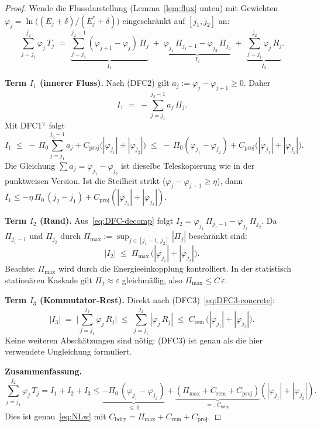 \documentclass[12pt,a4paper]{article}
\theoremstyle{breakdef}
\theoremstyle{breakplain}
\theoremstyle{breakdef}
\begin{document}
\begin{proof}
Wende die Flussdarstellung (Lemma~\ref{lem:flux} unten) mit Gewichten
$\varphi_j = \ln\bigl((E_j+\delta)/(E_j^*+\delta)\bigr)$
eingeschränkt auf $[j_1, j_2]$ an:
\begin{equation}\label{eq:DFC-decomp}
  \sum_{j=j_1}^{j_2} \varphi_j\,T_j
  \;=\;
  \underbrace{\sum_{j=j_1}^{j_2-1}
    (\varphi_{j+1} - \varphi_j)\,\Pi_j}_{I_1}
  \;+\;
  \underbrace{\varphi_{j_1}\,\Pi_{j_1-1}
    - \varphi_{j_2}\,\Pi_{j_2}}_{I_2}
  \;+\;
  \underbrace{\sum_{j=j_1}^{j_2} \varphi_j\,R_j}_{I_3}.
\end{equation}

\textbf{Term $I_1$ (innerer Fluss).}\quad
Nach (DFC2) gilt $a_j:=\varphi_j-\varphi_{j+1}\ge0$. Daher
\[
  I_1
  \;=\; -\sum_{j=j_1}^{j_2-1} a_j\,\Pi_j.
\]
Mit DFC1$^\vee$ folgt
\[
  I_1
  \;\le\;
  -\,\Pi_0\sum_{j=j_1}^{j_2-1}a_j
  + C_{\mathrm{proj}}\bigl(|\varphi_{j_1}|+|\varphi_{j_2}|\bigr)
  \;\le\;
  -\,\Pi_0(\varphi_{j_1}-\varphi_{j_2})
  + C_{\mathrm{proj}}\bigl(|\varphi_{j_1}|+|\varphi_{j_2}|\bigr).
\]
Die Gleichung $\sum a_j=\varphi_{j_1}-\varphi_{j_2}$ ist dieselbe
Teleskopierung wie in der punktweisen Version.
Ist die Steilheit strikt ($\varphi_j - \varphi_{j+1} \ge \eta$),
dann
$I_1 \le -\eta\,\Pi_0\,(j_2 - j_1)
+ C_{\mathrm{proj}}(|\varphi_{j_1}|+|\varphi_{j_2}|)$.

\textbf{Term $I_2$ (Rand).}\quad
Aus~\eqref{eq:DFC-decomp} folgt $I_2 = \varphi_{j_1}\,\Pi_{j_1-1}
- \varphi_{j_2}\,\Pi_{j_2}$. Da $\Pi_{j_1-1}$ und $\Pi_{j_2}$
durch $\Pi_{\max} := \sup_{j \in [j_1-1,\,j_2]}|\Pi_j|$ beschränkt sind:
\begin{equation}\label{eq:I2-bound}
  |I_2|
  \;\le\;
  \Pi_{\max}\,\bigl(|\varphi_{j_1}| + |\varphi_{j_2}|\bigr).
\end{equation}
Beachte: $\Pi_{\max}$ wird durch die Energieeinkopplung kontrolliert. In
der statistisch stationären Kaskade gilt $\Pi_j \approx \varepsilon$
gleichmäßig, also $\Pi_{\max} \le C\,\varepsilon$.

\textbf{Term $I_3$ (Kommutator-Rest).}\quad
Direkt nach (DFC3)~\eqref{eq:DFC3-concrete}:
\begin{equation}\label{eq:I3-bound}
  |I_3|
  \;=\;
  \biggl|\sum_{j=j_1}^{j_2} \varphi_j\,R_j\biggr|
  \;\le\;
  \sum_{j=j_1}^{j_2} |\varphi_j\,R_j|
  \;\le\;
  C_{\mathrm{rem}}\,\bigl(|\varphi_{j_1}| + |\varphi_{j_2}|\bigr).
\end{equation}
Keine weiteren Abschätzungen sind nötig: (DFC3) ist genau als die
hier verwendete Ungleichung formuliert.

\medskip\noindent
\textbf{Zusammenfassung.}\quad
\[
\sum_{j=j_1}^{j_2} \varphi_j\,T_j
= I_1 + I_2 + I_3
\le
\underbrace{-\Pi_0\,(\varphi_{j_1}-\varphi_{j_2})}_{\le\,0}
+ \underbrace{(\Pi_{\max}+C_{\mathrm{rem}}+C_{\mathrm{proj}})}_
  {=:\,C_{\mathrm{bdry}}}
  (|\varphi_{j_1}|+|\varphi_{j_2}|).
\]
Dies ist genau~\eqref{eq:NLw} mit
$C_{\mathrm{bdry}} = \Pi_{\max} + C_{\mathrm{rem}} + C_{\mathrm{proj}}$.
\end{proof}
\end{document}
